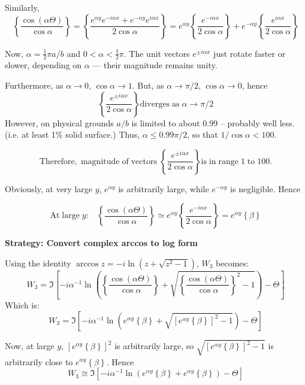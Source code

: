 \documentclass{article}
\begin{document}
Similarly,\[\left\{ \frac{\cos(\alpha \Theta)}{\cos \alpha} \right\} =
\left\{ \frac{e^{\alpha y} e^{- i \alpha x} + e^{-\alpha y} e^{ i \alpha x}}
{2 \cos \alpha} \right\} =
e^{\alpha y}  \left\{ \frac{ e^{- i \alpha x}}{2 \cos \alpha} \right\} + 
e^{-\alpha y}  \left\{ \frac{ e^{ i \alpha x}}{2 \cos \alpha} \right\}\]

Now, $\alpha = \frac{1}{2} \pi a/b$ and $0 < \alpha < \frac{1}{2} \pi$.
The unit vectors $e^{\pm i \alpha x}$ just rotate faster or slower, depending on $\alpha$ --- their magnitude remains unity.

Furthermore, as $\alpha \rightarrow 0$, $\cos \alpha \rightarrow 1$. But, as $\alpha \rightarrow \pi/2$, $\cos \alpha \rightarrow 0$, hence
\[ \left\{ \frac{ e^{ \pm i \alpha x}}{2 \cos \alpha} \right\} \mathrm{diverges \; as \;}
\alpha \rightarrow \pi/2 \]
However, on physical grounds $a/b$ is limited to about 0.99 -- probably well less.  (i.e. at least 1\% solid surface.)  Thus, $\alpha \leq 0.99 \pi/2$, so that $1/ \cos \alpha < 100$.

\[ \mathrm{Therefore, \; magnitude \; of \; vectors \;}
 \left\{ \frac{ e^{ \pm i \alpha x}}{2 \cos \alpha} \right\} 
   \mathrm{is \; in \; range \; 1 \; to \; 100.}\]
   
Obviously, at very large $y$, $e^{\alpha y}$ is arbitrarily large, while $e^{-\alpha y}$ is negligible.  Hence

\[ \mathrm{At \; large \; }y: \;\;\; \left\{ \frac{\cos(\alpha \Theta)}{\cos \alpha} \right\}
\simeq
e^{\alpha y} \left\{ \frac{ e^{- i \alpha x}}{2 \cos \alpha} \right\}
= e^{\alpha y} \left\{ \beta \right\}  \]

\vspace{1em}
\textbf{Strategy: Convert complex arccos to log form}
\vspace{1em}

Using the identity $\arccos z = - i \ln (z + \sqrt{z^{2} - 1})$, $W_{3}$ becomes:
\[ W_{3} = \Im \left[  
 - i \alpha^{-1} \ln \left(
 \left\{ \frac{\cos(\alpha \Theta)}{\cos \alpha} \right\}
 + \sqrt{\left\{ \frac{\cos(\alpha \Theta)}{\cos \alpha} \right\}^{2} - 1} \right) 
  - \Theta  \right] \]
Which is:
\[ W_{3} = \Im \left[  
 - i \alpha^{-1} \ln \left(
 e^{\alpha y} \left\{ \beta \right\}
 + \sqrt{ \left[ e^{\alpha y} \left\{ \beta \right\} \right] ^{2} - 1} \right) 
  - \Theta  \right] \]  
  
Now, at large $y$, $ \left[ e^{\alpha y} \left\{ \beta \right\} \right] ^{2} $ is arbitrarily large, so 
$ \sqrt{ \left[ e^{\alpha y} \left\{ \beta \right\} \right] ^{2} - 1} $
is arbitrarily close to $ e^{\alpha y} \left\{ \beta \right\} $. 
Hence
\[ W_{3} \cong \Im \left[  
 - i \alpha^{-1} \ln \left(
   e^{\alpha y} \left\{ \beta \right\}
 + e^{\alpha y} \left\{ \beta \right\} \right) 
  - \Theta  \right] \]  
\end{document}
